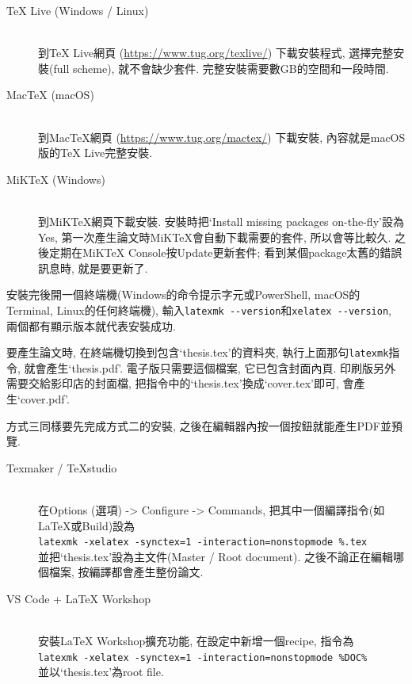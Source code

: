 \begin{description}
  \item[TeX Live (Windows / Linux)] \hfill\\
    到TeX Live網頁 (\url{https://www.tug.org/texlive/}) 下載安裝程式, 選擇完整安裝(full scheme), 就不會缺少套件. 完整安裝需要數GB的空間和一段時間.

  \item[MacTeX (macOS)] \hfill\\
    到MacTeX網頁 (\url{https://www.tug.org/mactex/}) 下載安裝, 內容就是macOS版的TeX Live完整安裝.

  \item[MiKTeX (Windows)] \hfill\\
    到MiKTeX網頁下載安裝. 安裝時把`Install missing packages on-the-fly'設為Yes, 第一次產生論文時MiKTeX會自動下載需要的套件, 所以會等比較久. 之後定期在MiKTeX Console按Update更新套件; 看到某個package太舊的錯誤訊息時, 就是要更新了.
\end{description}

安裝完後開一個終端機(Windows的命令提示字元或PowerShell, macOS的Terminal, Linux的任何終端機), 輸入\verb|latexmk --version|和\verb|xelatex --version|, 兩個都有顯示版本就代表安裝成功.

要產生論文時, 在終端機切換到包含`thesis.tex'的資料夾, 執行上面那句\texttt{latexmk}指令, 就會產生`thesis.pdf'. 電子版只需要這個檔案, 它已包含封面內頁. 印刷版另外需要交給影印店的封面檔, 把指令中的`thesis.tex'換成`cover.tex'即可, 會產生`cover.pdf'.


方式三同樣要先完成方式二的安裝, 之後在編輯器內按一個按鈕就能產生PDF並預覽.

\begin{description}
  \item[Texmaker / TeXstudio] \hfill\\
    在Options (選項) -> Configure -> Commands, 把其中一個編譯指令(如LaTeX或Build)設為\\
    \verb|latexmk -xelatex -synctex=1 -interaction=nonstopmode %.tex|\\
    並把`thesis.tex'設為主文件(Master / Root document). 之後不論正在編輯哪個檔案, 按編譯都會產生整份論文.

  \item[VS Code + LaTeX Workshop] \hfill\\
    安裝LaTeX Workshop擴充功能, 在設定中新增一個recipe, 指令為\\
    \verb|latexmk -xelatex -synctex=1 -interaction=nonstopmode %DOC%|\\
    並以`thesis.tex'為root file.
\end{description}

